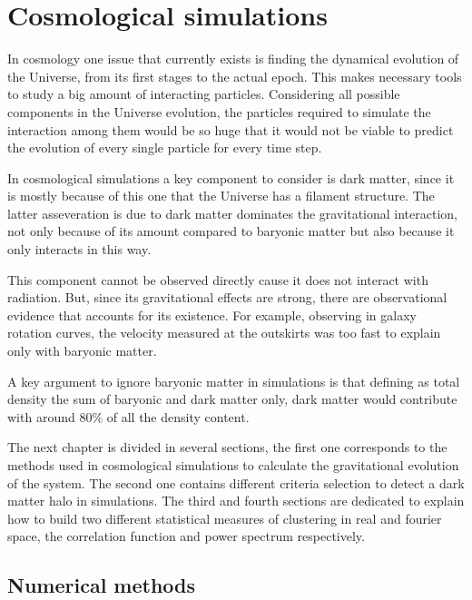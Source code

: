 \chapter{ Cosmological simulations }


In cosmology one issue that currently exists is finding 
the dynamical evolution of the Universe, from its first 
stages to the actual epoch. This makes necessary tools to
study a big amount of interacting particles. 
Considering all possible components in the Universe evolution, 
the particles required to simulate the interaction among them
would be so huge that it would not be viable
to predict the evolution of every single particle for every
time step. 

In cosmological simulations a key component to consider
is dark matter, since it is mostly because of this one that 
the Universe has a filament structure. 
The latter asseveration is due to dark matter dominates the gravitational
interaction, not only because of its amount compared to
baryonic matter but also because it only interacts in this way.

This component cannot be observed directly cause it does not interact 
with radiation. But, since its gravitational effects are strong, there are 
observational evidence that accounts for its existence. For example, 
observing in galaxy rotation curves, the velocity measured at the outskirts 
was too fast to explain only with baryonic matter. 

A key argument to ignore baryonic matter in simulations is that
defining as total density the sum of baryonic and dark matter only, 
dark matter would contribute with around $80\%$ of all the density
content. 

The next chapter is divided in several sections, the first one
corresponds to the methods used in cosmological simulations to
calculate the gravitational evolution of the system. The second
one contains different criteria selection to detect a dark matter
halo in simulations. The third and fourth sections are dedicated
to explain how to build two different statistical measures of clustering
in real and fourier space, the correlation function and power spectrum 
respectively. 


\section{ Numerical methods }




